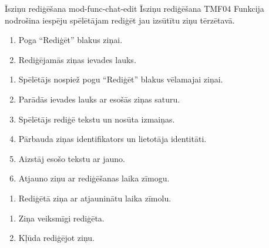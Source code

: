 \moduleFunctionTable
{Īsziņu rediģēšana}
{mod-func-chat-edit}
{Īsziņu rediģēšana}
{TMF04}
{
	Funkcija nodrošina iespēju spēlētājam rediģēt jau izsūtītu ziņu tērzētavā.
}
{
	\begin{enumerate}
		\item Poga ``Rediģēt'' blakus ziņai.
		\item Rediģējamās ziņas ievades lauks.
	\end{enumerate}
}
{
	\begin{enumerate}
		\item Spēlētājs nospiež pogu ``Rediģēt'' blakus vēlamajai ziņai.
		\item Parādās ievades lauks ar esošās ziņas saturu.
		\item Spēlētājs rediģē tekstu un nosūta izmaiņas.
		\item Pārbauda ziņas identifikators un lietotāja identitāti.
		\item Aizstāj esošo tekstu ar jauno.
		\item Atjauno ziņu ar rediģēšanas laika zīmogu.

	\end{enumerate}
}
{
	\begin{enumerate}
		\item Rediģētā ziņa ar atjauninātu laika zīmolu.
	\end{enumerate}
}
{
	\begin{enumerate}
		\item Ziņa veiksmīgi rediģēta.
		\item Kļūda rediģējot ziņu.
	\end{enumerate}
}
